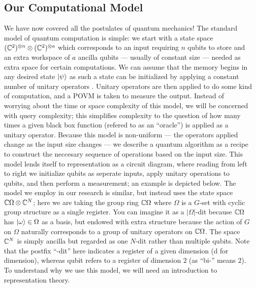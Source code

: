 \documentclass[12pt,twoside]{reedthesis}
\theoremstyle{plain}   %
\theoremstyle{definition}
\theoremstyle{remark}
\numberwithin{equation}{section}
\begin{document}
  \subsection{Our Computational Model}
   We have now covered all the postulates of quantum mechanics! The standard model of quantum computation is simple: we start with a state space $(\mathbb{C}^{2})^{\otimes n} \otimes (\mathbb{C}^{2})^{\otimes a}$ which corresponds
   to an input requiring $n$ qubits to store and an extra workspace of $a$ ancilla qubits --- usually of constant size --- needed as extra space for certain computations.
   We can assume that the memory begins in any desired state $\ket{\psi}$ as such a state can be initialized by applying a constant number of unitary operators .
   Unitary operators are then applied to do some kind of computation, and a POVM is taken to measure the output.
   Instead of worrying about the time or space complexity of this model, we will be concerned with query complexity; this simplifies complexity to the question of how many times a given black box function
   (refered to as an ``oracle'') is applied as a unitary operator.
   Because this model is non-uniform --- the operators applied change as the input size changes --- we describe a quantum algorithm as a recipe to construct the neccesary sequence of operations
   based on the input size. This model lends itself to representation as a circuit diagram, where reading from left to right we initialize qubits as seperate inputs, apply unitary operations
   to qubits, and then perform a measurement; an example is depicted below.
   The model we employ in our research is similar, but instead uses the state space $\mathbb{C}\Omega \otimes \mathbb{C}^N$; here we are taking the group ring $\mathbb{C} \Omega$ where $\Omega$ is a $G$-set with cyclic group structure
   as a single register. You can imagine it as a $|\Omega|$-dit because $\mathbb{C}\Omega$ has $\ket{\omega} \in \Omega$ as a basis, but endowed with extra structure because the action of $G$ on $\Omega$ naturally corresponds
   to a group of unitary operators on $\mathbb{C}\Omega$. The space $\mathbb{C}^N$ is simply ancilla but regarded as one $N$-dit rather than multiple qubits. Note that the postfix ``-dit'' here indicates a register of a given dimension
   (d for dimension),
   whereas qubit refers to a register of dimension $2$ (as ``bi-'' means $2$).
   To understand why we use this model, we will need an introduction to representation theory.
\end{document}
